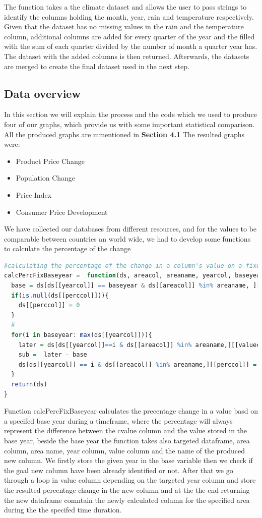 \documentclass[11pt]{article}
\begin{document}
The function takes a the climate dataset and allows the user to pass strings to identify the columns holding the month, year, rain and temperature respectively. Given that the dataset has no missing values in the rain and the temperature column, additional columns are added for every quarter of the year and the filled with the sum of each quarter divided by the number of month a quarter year has.
The dataset with the added columns is then returned. Afterwards, the datasets are merged to create the final dataset used in the next step.

\subsection{Data overview}

In this section we will explain the process and the code which we used to produce four of our graphs, which provide us with some important statistical comparison. All the produced graphs are mmentioned in \textbf{Section 4.1}
The resulted graphs were: 
\begin{itemize}
\item Product Price Change 
\item Population Change 
\item Price Index 
\item Consumer Price Development 
\end{itemize}

We have collected our databases from different resources, and for the values to be comparable between countries an world wide, we had to develop some functions to calculate the percentage of the change
\begin{lstlisting}[language= R, captionpos=b,caption=\href{https://github.com/jaidikam/sps_ws1718/tree/master/Qfolder7}{SPL\_Q7\_countries\_exploration.R}]
#calculating the percentage of the change in a column's value on a fixed base year 
calcPercFixBaseyear =  function(ds, areacol, areaname, yearcol, baseyear,valuecol, perccol){
  base = ds[ds[[yearcol]] == baseyear & ds[[areacol]] %in% areaname, ][[valuecol]]
  if(is.null(ds[[perccol]])){
    ds[[perccol]] = 0 
  }
  #
  for(i in baseyear: max(ds[[yearcol]])){
    later = ds[ds[[yearcol]]==i & ds[[areacol]] %in% areaname,][[valuecol]]
    sub =  later - base
    ds[ds[[yearcol]] == i & ds[[areacol]] %in% areaname,][[perccol]] = (sub / later) * 100
  }
  return(ds)
}
\end{lstlisting}
Function calcPercFixBaseyear calculates the precentage change in a value basd on a specifed base year during a timeframe, where the percentage will always represent the difference between the cvalue column and the value stored in the base year, beside the base year the function takes also targeted dataframe,  area column, area name, year column, value column and the name of the produced new column. 
We firstly store the given year in the base variable then we check if the goal new column have been already identified or not. After that we go through a loop in value column depending on the targeted year column and store the resulted percentage change in the new column and at the the end returning the new dataframe comntain the newly calculated column for the specified area during the the specifed time duration. 
\end{document}
